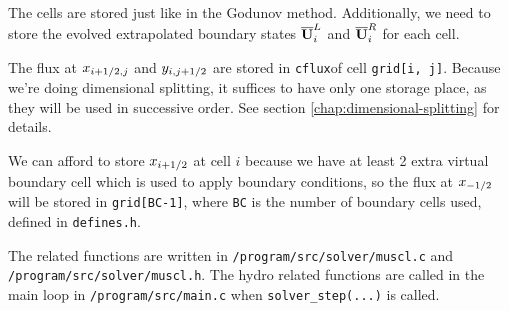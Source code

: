 The cells are stored just like in the Godunov method.
Additionally, we need to store the evolved extrapolated boundary states $\overline{\mathbf{U}}_i^L$ and $\overline{\mathbf{U}}_i^R$ for each cell.


The flux at $x_{i+1/2, j}$ and $y_{i, j+1/2}$ are stored in \texttt{cflux}of cell \verb|grid[i, j]|.
Because we're doing dimensional splitting, it suffices to have only one storage place, as they will be used in successive order.
See section \ref{chap:dimensional-splitting} for details.

We can afford to store $x_{i+1/2}$ at cell $i$ because we have at least 2 extra virtual boundary cell which is used to apply boundary conditions, so the flux at $x_{-1/2}$ will be stored in \verb|grid[BC-1]|, where \texttt{BC} is the number of boundary cells used, defined in \texttt{defines.h}.




The related functions are written in \texttt{/program/src/solver/muscl.c} and \texttt{/program/src/solver/muscl.h}.
The hydro related functions are called in the main loop in \texttt{/program/src/main.c} when \verb|solver_step(...)| is called.

